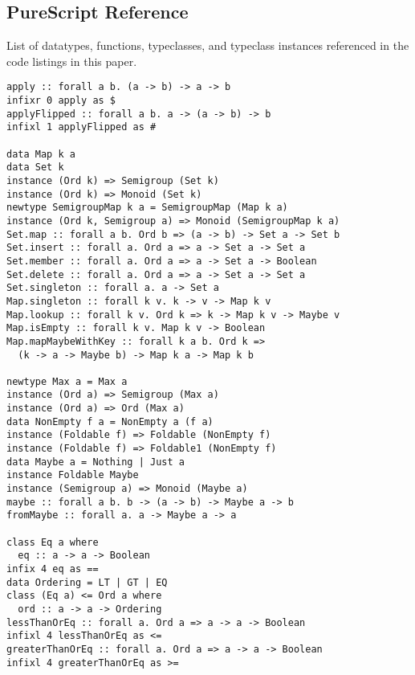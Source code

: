 \documentclass[11pt, twoside, reqno]{book}
\begin{document}
\begin{appdices}
\chapter{PureScript Reference}
List of datatypes, functions, typeclasses, and typeclass instances referenced in the code listings in this paper.

\begin{verbatim}
apply :: forall a b. (a -> b) -> a -> b
infixr 0 apply as $
applyFlipped :: forall a b. a -> (a -> b) -> b
infixl 1 applyFlipped as #

data Map k a
data Set k
instance (Ord k) => Semigroup (Set k)
instance (Ord k) => Monoid (Set k)
newtype SemigroupMap k a = SemigroupMap (Map k a)
instance (Ord k, Semigroup a) => Monoid (SemigroupMap k a)
Set.map :: forall a b. Ord b => (a -> b) -> Set a -> Set b
Set.insert :: forall a. Ord a => a -> Set a -> Set a
Set.member :: forall a. Ord a => a -> Set a -> Boolean
Set.delete :: forall a. Ord a => a -> Set a -> Set a
Set.singleton :: forall a. a -> Set a
Map.singleton :: forall k v. k -> v -> Map k v
Map.lookup :: forall k v. Ord k => k -> Map k v -> Maybe v
Map.isEmpty :: forall k v. Map k v -> Boolean
Map.mapMaybeWithKey :: forall k a b. Ord k =>
  (k -> a -> Maybe b) -> Map k a -> Map k b

newtype Max a = Max a
instance (Ord a) => Semigroup (Max a)
instance (Ord a) => Ord (Max a)
data NonEmpty f a = NonEmpty a (f a)
instance (Foldable f) => Foldable (NonEmpty f)
instance (Foldable f) => Foldable1 (NonEmpty f)
data Maybe a = Nothing | Just a
instance Foldable Maybe
instance (Semigroup a) => Monoid (Maybe a)
maybe :: forall a b. b -> (a -> b) -> Maybe a -> b
fromMaybe :: forall a. a -> Maybe a -> a

class Eq a where
  eq :: a -> a -> Boolean
infix 4 eq as ==
data Ordering = LT | GT | EQ
class (Eq a) <= Ord a where
  ord :: a -> a -> Ordering
lessThanOrEq :: forall a. Ord a => a -> a -> Boolean
infixl 4 lessThanOrEq as <=
greaterThanOrEq :: forall a. Ord a => a -> a -> Boolean
infixl 4 greaterThanOrEq as >=




\end{verbatim}
\end{appdices}
\end{document}
